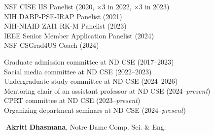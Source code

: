 \documentclass[10pt]{article}
\newenvironment{myindentpar}[1]%
{\begin{list}{}%
         {\setlength{\leftmargin}{#1}}%
         \item[]%
}
{\end{list}}
\newcounter{list}
\begin{document}
\begin{myindentpar}{0.75cm}

\hspace{-0.75cm}{\bf Professional Service}

{\small
\textcolor{white}{} NSF CISE IIS Panelist (2020, $\times 3$ in 2022, $\times 3$ in 2023) \\
\textcolor{white}{} NIH DABP-PSE-IRAP Panelist (2021) \\
\textcolor{white}{} NIH-NIAID ZAI1 RK-M Panelist (2023) \\
\textcolor{white}{} IEEE Senior Member Application Panelist (2024) \\
\textcolor{white}{} NSF CSGrad4US Coach (2024)
}

\hspace{-0.75cm}{\bf Departmental Service}

{\small

\textcolor{white}{} Graduate admission committee at ND CSE (2017--2023) \\
\textcolor{white}{} Social media committee at ND CSE (2022--2023) \\
\textcolor{white}{} Undergraduate study committee at ND CSE (2024--2026) \\
\textcolor{white}{} Mentoring chair of an assistant professor at ND CSE (2024--\textit{present}) \\
\textcolor{white}{} CPRT committee at ND CSE (2023--\textit{present}) \\
\textcolor{white}{} Organizing department seminars at ND CSE (2024--\textit{present})

}

\hspace{-0.75cm}{\bf Master's Dissertation Committee}

{\small

\textcolor{white}{.}{\bf Akriti Dhasmana}, Notre Dame Comp. Sci. \& Eng.

}

\hspace{-0.75cm}{\bf Ph.D. Dissertation Committee}

{\small

}
\end{myindentpar}
\end{document}
